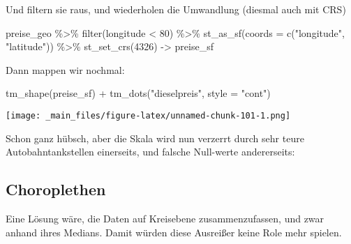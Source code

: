 \documentclass[11pt,german,a4paper]{article}
\newenvironment{Shaded}{\begin{snugshade}}{\end{snugshade}}
\newcommand{\AttributeTok}[1]{\textcolor[rgb]{0.77,0.63,0.00}{#1}}
\newcommand{\DecValTok}[1]{\textcolor[rgb]{0.00,0.00,0.81}{#1}}
\newcommand{\DocumentationTok}[1]{\textcolor[rgb]{0.56,0.35,0.01}{\textbf{\textit{#1}}}}
\newcommand{\FunctionTok}[1]{\textcolor[rgb]{0.00,0.00,0.00}{#1}}
\newcommand{\NormalTok}[1]{#1}
\newcommand{\OtherTok}[1]{\textcolor[rgb]{0.56,0.35,0.01}{#1}}
\newcommand{\SpecialCharTok}[1]{\textcolor[rgb]{0.00,0.00,0.00}{#1}}
\newcommand{\StringTok}[1]{\textcolor[rgb]{0.31,0.60,0.02}{#1}}
\begin{document}
Und filtern sie raus, und wiederholen die Umwandlung (diesmal auch mit CRS)

\begin{Shaded}
\begin{Highlighting}[]
\NormalTok{preise\_geo }\SpecialCharTok{\%\textgreater{}\%}
  \FunctionTok{filter}\NormalTok{(longitude }\SpecialCharTok{\textless{}} \DecValTok{80}\NormalTok{) }\SpecialCharTok{\%\textgreater{}\%}
  \FunctionTok{st\_as\_sf}\NormalTok{(}\AttributeTok{coords =} \FunctionTok{c}\NormalTok{(}\StringTok{"longitude"}\NormalTok{, }\StringTok{"latitude"}\NormalTok{)) }\SpecialCharTok{\%\textgreater{}\%}
  \FunctionTok{st\_set\_crs}\NormalTok{(}\DecValTok{4326}\NormalTok{) }\OtherTok{{-}\textgreater{}}\NormalTok{ preise\_sf}
\end{Highlighting}
\end{Shaded}

Dann mappen wir nochmal:

\begin{Shaded}
\begin{Highlighting}[]
\FunctionTok{tm\_shape}\NormalTok{(preise\_sf) }\SpecialCharTok{+}
  \FunctionTok{tm\_dots}\NormalTok{(}\StringTok{"dieselpreis"}\NormalTok{, }\AttributeTok{style =} \StringTok{"cont"}\NormalTok{)}
\end{Highlighting}
\end{Shaded}

\texttt{[image: \_main\_files/figure-latex/unnamed-chunk-101-1.png]}

Schon ganz hübsch, aber die Skala wird nun verzerrt durch sehr teure Autobahntankstellen einerseits, und falsche Null-werte andererseits:

\begin{Shaded}
\end{Shaded}

\hypertarget{choroplethen}{%
\subsection{Choroplethen}\label{choroplethen}}

Eine Lösung wäre, die Daten auf Kreisebene zusammenzufassen, und zwar anhand ihres Medians. Damit würden diese Ausreißer keine Role mehr spielen.
\end{document}
